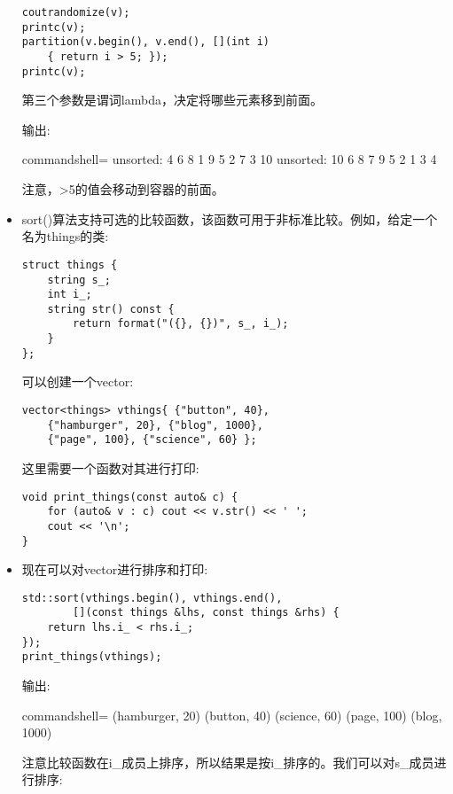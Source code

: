 \begin{itemize}
\begin{lstlisting}[style=styleCXX]
coutrandomize(v);
printc(v);
partition(v.begin(), v.end(), [](int i)
	{ return i > 5; });
printc(v);
\end{lstlisting}

第三个参数是谓词lambda，决定将哪些元素移到前面。

输出:

\begin{tcblisting}{commandshell={}}
unsorted: 4 6 8 1 9 5 2 7 3 10
unsorted: 10 6 8 7 9 5 2 1 3 4
\end{tcblisting}

注意，>5的值会移动到容器的前面。

\item 
sort()算法支持可选的比较函数，该函数可用于非标准比较。例如，给定一个名为things的类:

\begin{lstlisting}[style=styleCXX]
struct things {
	string s_;
	int i_;
	string str() const {
		return format("({}, {})", s_, i_);
	}
};
\end{lstlisting}

可以创建一个vector:

\begin{lstlisting}[style=styleCXX]
vector<things> vthings{ {"button", 40},
	{"hamburger", 20}, {"blog", 1000},
	{"page", 100}, {"science", 60} };
\end{lstlisting}

这里需要一个函数对其进行打印:

\begin{lstlisting}[style=styleCXX]
void print_things(const auto& c) {
	for (auto& v : c) cout << v.str() << ' ';
	cout << '\n';
}
\end{lstlisting}

\item 
现在可以对vector进行排序和打印:

\begin{lstlisting}[style=styleCXX]
std::sort(vthings.begin(), vthings.end(),
		[](const things &lhs, const things &rhs) {
	return lhs.i_ < rhs.i_;
});
print_things(vthings);
\end{lstlisting}

输出:

\begin{tcblisting}{commandshell={}}
(hamburger, 20) (button, 40) (science, 60) (page, 100)
(blog, 1000)
\end{tcblisting}

注意比较函数在i\_成员上排序，所以结果是按i\_排序的。我们可以对s\_成员进行排序:


\end{itemize}
